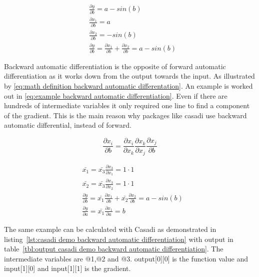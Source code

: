 \begin{equation}
	\begin{aligned}
		& \frac{\partial y}{\partial b} = a - sin(b) \\
		& \frac{\partial x_1}{\partial b} = a  \\
		& \frac{\partial x_2}{\partial b} = -sin(b) \\
		& \frac{\partial y}{\partial b} = \frac{\partial x_1}{\partial b} + \frac{\partial x_2}{\partial b}	 = a - sin(b)
	\end{aligned}
	\label{eq:example forward automatic differentiation}
\end{equation}

Backward automatic differentiation is the opposite of forward automatic differentiation as it works down from the output towards the input. As illustrated by \eqref{eq:math definition backward automatic differentation}. An example is worked out in \eqref{eq:example backward automatic differentiation}. Even if there are hundreds of intermediate variables it only required one line to find a component of the gradient. This is the main reason why packages like casadi use backward automatic differential, instead of forward.

\begin{equation}
	\frac{\partial x_i}{\partial b} = \frac{\partial x_i}{\partial x_k}\frac{\partial x_k}{\partial x_j}\frac{\partial x_j}{\partial b}
	\label{eq:math definition backward automatic differentation}
\end{equation}

\begin{equation}
\begin{aligned}
& \bar{x_1} = \bar{x_3} \frac{\partial x_3}{\partial x_1} = 1 \cdot 1 \\
& \bar{x_2} = \bar{x_3} \frac{\partial x_3}{\partial x_2} = 1 \cdot 1 \\
& \frac{\partial y}{\partial b} = \bar{x_1} \frac{\partial x_1}{\partial b} + \bar{x_2} \frac{\partial x_2}{\partial b} = a - sin(b)\\
& \frac{\partial y}{\partial a} = \bar{x_1} \frac{\partial x_1}{\partial a} = b
\end{aligned}
\label{eq:example backward automatic differentiation}
\end{equation}

The same example can be calculated with Casadi as demonstrated in listing~\ref{lst:casadi demo backward automatic differentiation} with output in table~\ref{tbl:output casadi demo backward automatic differentiation}. The intermediate variables are @1,@2 and @3. output[0][0] is the function value and input[1][0] and input[1][1] is the gradient. 

